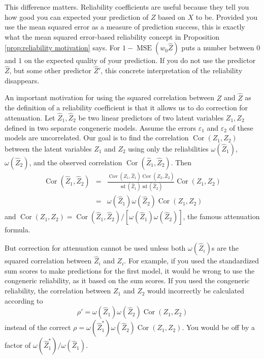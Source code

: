 \documentclass[twoside]{article}
\DeclareMathOperator{\sd}{sd}
\DeclareMathOperator{\Cor}{Cor}
\DeclareMathOperator{\Cov}{Cov}
\DeclareMathOperator{\MSE}{MSE}
\begin{document}
This difference matters. Reliability coefficients are useful because they tell you how good you can expected your prediction of $Z$ based on $X$ to be. Provided you use the mean squared error as a measure of prediction success, this is exactly what the mean squared error-based reliability concept in Proposition \ref{prop:reliability motivation} says. For $1 - \MSE(w_0\hat{Z})$ puts a number between $0$ and $1$ on the expected quality of your prediction. If you do not use the predictor $\hat{Z}$, but some other predictor $\hat{Z}'$, this concrete interpretation of the reliability disappears. 

An important motivation for using the squared
correlation between $Z$ and $\hat{Z}$ as the definition of a
reliability coefficient is that it allows us to do correction for
attenuation. Let $\hat{Z}_{1},\hat{Z}_{2}$ be two linear
predictors of two latent variables $Z_{1},Z_{2}$ defined in two separate
congeneric models. Assume the errors $\varepsilon_{1}$ and $\varepsilon_{2}$ of these models
are uncorrelated. Our goal is to find the correlation $\Cor(Z_{1},Z_{2})$
between the latent variables $Z_{1}$ and $Z_{2}$ using only the
reliabilities $\omega(\hat{Z}_{1})$, $\omega(\hat{Z}_{2})$,
and the observed correlation $\Cor(\hat{Z}_{1},\hat{Z}_{2})$.
Then
\begin{eqnarray*}
\Cor(\hat{Z}_{1},\hat{Z}_{2}) & = & \frac{\Cov(Z_{1},\hat{Z}_{1})\Cov(Z_{2},\hat{Z}_{2})}{\sd(\hat{Z}_{1})\sd(\hat{Z}_{2})}\Cor(Z_{1},Z_{2})\\
 & = & \omega(\hat{Z}_{1})\omega(\hat{Z}_{2})\Cor(Z_{1},Z_{2})
\end{eqnarray*}
and $\Cor(Z_{1},Z_{2})=\Cor(\hat{Z}_{1},\hat{Z}_{2})/[\omega(\hat{Z}_{1})\omega(\hat{Z}_{2})]$,
the famous \citet{spearman1904proof} attenuation formula.

But correction for attenuation cannot be used unless both $\omega(\hat{Z}_i)$s are the squared correlation between $\hat{Z}_i$ and $Z_i$. For example, if you used the standardized sum scores to make predictions for the first model, it would be wrong to use the congeneric reliability, as it based on the sum scores. If you used the congeneric reliability, the correlation between $Z_1$ and $Z_2$ would incorrectly be calculated according to $$\rho'=\omega(\hat{Z}_{1})\omega(\hat{Z}_{2})\Cor(Z_{1},Z_{2})$$
instead of the correct $\rho=\omega(\hat{Z}_{1}^{*})\omega(\hat{Z}_{2})\Cor(Z_{1},Z_{2})$.
You would be off by a factor of $\omega(\hat{Z}_{1}^{*})/\omega(\hat{Z}_{1})$.
\end{document}
